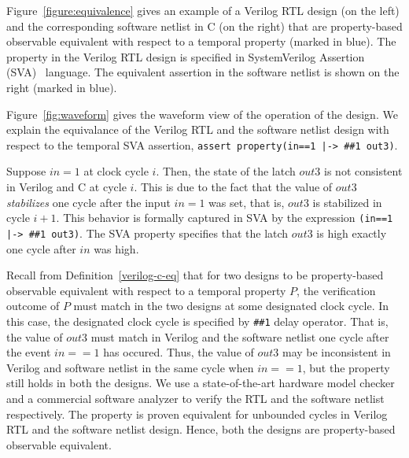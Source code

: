 \begin{example}
%
Figure~\ref{figure:equivalence} gives an example of a Verilog RTL design 
(on the left) and the corresponding software netlist in C (on the right) that are 
property-based observable equivalent with respect to a temporal 
property (marked in blue).  The property in the Verilog RTL design 
is specified in SystemVerilog Assertion (SVA)~\cite{SVA} language.  
The equivalent assertion in the software netlist is shown on the right (marked in blue).  


Figure~\ref{fig:waveform} gives the waveform view of 
the operation of the design. 
%
We explain the equivalance of the Verilog RTL and the 
software netlist design with respect to the temporal SVA 
assertion, \texttt{assert property(in==1 |-> \#\#1 out3)}.  
%


Suppose $in=1$ at clock cycle $i$.  Then, the state of 
the latch $out3$ is not consistent in Verilog and C at 
cycle $i$.  This is due to the fact that 
the value of $out3$ \emph{stabilizes} one cycle after the 
input $in=1$ was set, that is, $out3$ is stabilized in cycle $i+1$.  
This behavior is formally captured 
in SVA by the expression \texttt{(in==1 |-> \#\#1 out3)}.  
The SVA property specifies that the latch $out3$ is high 
exactly one cycle after $in$ was high.  
%

Recall from Definition~\ref{verilog-c-eq} that for two designs to be property-based 
observable equivalent with respect to a temporal property $P$,  the 
verification outcome of $P$ must match in the two designs at some 
designated clock cycle. 
%
In this case, the designated clock cycle is specified by \texttt{\#\#1}
delay operator.  That is, the value of $out3$ must match in Verilog 
and the software netlist one cycle after the event $in==1$ has occured. 
%
Thus, the value of $out3$ may be inconsistent in Verilog and software netlist 
in the same cycle when $in==1$, but the property still holds in both the designs. 
%
We use a state-of-the-art hardware model checker and a commercial 
software analyzer to verify the RTL and the software netlist respectively.  
The property is proven equivalent for unbounded cycles in Verilog RTL 
and the software netlist design.
%
Hence, both the designs are property-based observable equivalent. 
\end{example}
%
%
